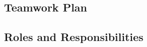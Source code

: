 \begin{multicols}{1}
\section{Teamwork Plan}
\label{sec:teamwork-plan}
\subsection{Roles and Responsibilities}
\label{subsec:roles-and-responsibilities}

\vspace{0.5em}

\centering
\renewcommand{\arraystretch}{1.75}



\end{multicols}
